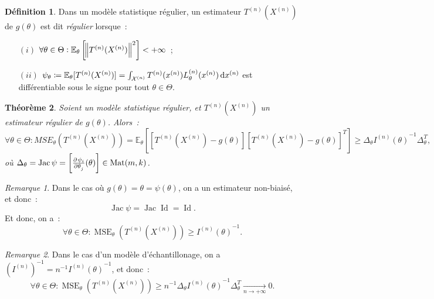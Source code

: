 \documentclass{report}
\DeclareMathOperator{\Mat}{Mat}
\DeclareMathOperator{\MSE}{MSE}
\DeclareMathOperator{\Jac}{Jac}  %
\DeclareMathOperator{\Id}{Id}
\newcommand{\E}{\mathbb E}
\newcommand{\pinfty}{{+\infty}}
\newcommand{\n}{{(n)}}
\newcommand{\Xn}{{X^\n}}
\newcommand{\Tn}{{T^\n}}
\newcommand{\TnXn}{{\Tn(\Xn)}}
\newtheorem{thm}{Théorème}[chapter]
\theoremstyle{definition}
\newtheorem{déf}[thm]{Définition}
\theoremstyle{remark}
\newtheorem*{rmq}{Remarque}
\begin{document}
			\begin{déf} Dans un modèle statistique régulier, un estimateur $\TnXn$ de $g(\theta)$ est dit \textit{régulier} lorsque~:
			\begin{itemize}
				\item[$(i)$]  $\forall \theta \in \Theta : \E_\theta\left[\norm {\TnXn}^2\right] < \pinfty$~;
				\item[$(ii)$] $\psi_\theta \coloneqq \E_\theta[\TnXn] = \int_{\mathcal X^{(n)}}\Tn(x^{(n)})L_\theta^{(n)}(x^{(n)})\dif x^{(n)}$
				est différentiable sous le signe pour tout $\theta \in \Theta$.
			\end{itemize}
			\end{déf}

			\begin{thm}\label{thm:borneinfMSE} Soient un modèle statistique régulier, et $\TnXn$ un estimateur régulier de $g(\theta)$. Alors~:
			\[\forall \theta \in \Theta : MSE_\theta(\TnXn) = \E_\theta\left[\left[\TnXn - g(\theta)\right]\left[\TnXn - g(\theta)\right]^T\right]
				\geq \Delta_\theta{I^{(n)}(\theta)}^{-1}\Delta_\theta^T,\]
			où $\Delta_\theta = \Jac \psi = \left[\pd {\psi_i}{\theta_j}(\theta)\right] \in \Mat(m, k)$.
			\end{thm}

			\begin{rmq} Dans le cas où $g(\theta) = \theta = \psi(\theta)$, on a un estimateur non-biaisé, et donc~:
			\[\Jac \psi = \Jac \Id = \Id.\]
			Et donc, on a~:
			\[\forall \theta \in \Theta : \MSE_\theta(\TnXn) \geq {I^{(n)}(\theta)}^{-1}.\]
			\end{rmq}

			\begin{rmq} Dans le cas d'un modèle d'échantillonage, on a $(I^{(n)})^{-1} = n^{-1}{I^{(n)}(\theta)}^{-1}$, et donc~:
			\[\forall \theta \in \Theta : \MSE_\theta(\TnXn) \geq n^{-1}\Delta_\theta{I^{(n)}(\theta)}^{-1}\Delta_\theta^T \xrightarrow[n \to \pinfty]{} 0.\]
			\end{rmq}
\end{document}
